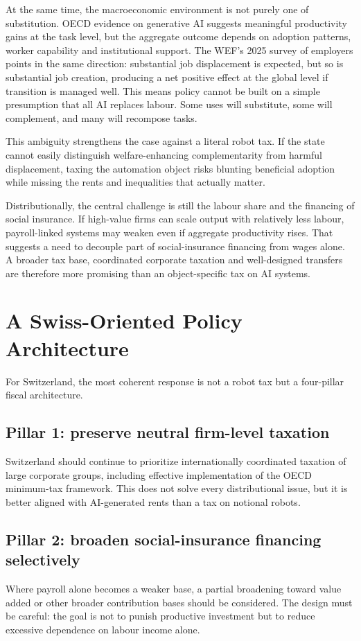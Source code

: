 \documentclass[11pt]{article}
\begin{document}
At the same time, the macroeconomic environment is not purely one of substitution. OECD evidence on generative AI suggests meaningful productivity gains at the task level, but the aggregate outcome depends on adoption patterns, worker capability and institutional support. The WEF's 2025 survey of employers points in the same direction: substantial job displacement is expected, but so is substantial job creation, producing a net positive effect at the global level if transition is managed well. This means policy cannot be built on a simple presumption that all AI replaces labour. Some uses will substitute, some will complement, and many will recompose tasks.

This ambiguity strengthens the case against a literal robot tax. If the state cannot easily distinguish welfare-enhancing complementarity from harmful displacement, taxing the automation object risks blunting beneficial adoption while missing the rents and inequalities that actually matter.

Distributionally, the central challenge is still the labour share and the financing of social insurance. If high-value firms can scale output with relatively less labour, payroll-linked systems may weaken even if aggregate productivity rises. That suggests a need to decouple part of social-insurance financing from wages alone. A broader tax base, coordinated corporate taxation and well-designed transfers are therefore more promising than an object-specific tax on AI systems.

\section{A Swiss-Oriented Policy Architecture}
For Switzerland, the most coherent response is not a robot tax but a four-pillar fiscal architecture.

\subsection{Pillar 1: preserve neutral firm-level taxation}
Switzerland should continue to prioritize internationally coordinated taxation of large corporate groups, including effective implementation of the OECD minimum-tax framework. This does not solve every distributional issue, but it is better aligned with AI-generated rents than a tax on notional robots.

\subsection{Pillar 2: broaden social-insurance financing selectively}
Where payroll alone becomes a weaker base, a partial broadening toward value added or other broader contribution bases should be considered. The design must be careful: the goal is not to punish productive investment but to reduce excessive dependence on labour income alone.
\end{document}
